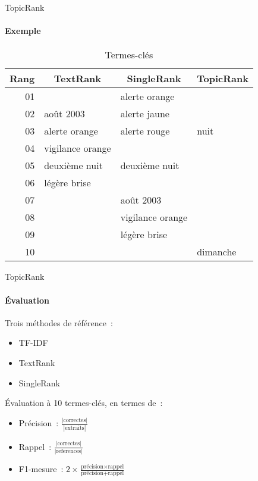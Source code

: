 \begin{frame}{TopicRank}\framesubtitle{Exemple}
  \begin{table}
    \centering
    \begin{tabular}{r|l|l|l}
      \toprule
      \textbf{Rang} & \multicolumn{1}{c|}{\textbf{TextRank}} &
      \multicolumn{1}{c|}{\textbf{SingleRank}} & \multicolumn{1}{c}{\textbf{TopicRank}} \\
      \hline
      01 & \cellcolor{termithorange!30}{août 2012} & alerte orange & \cellcolor{termithorange!30}{Luxembourg}\\
      02 & août 2003 & alerte jaune & \cellcolor{termithorange!30}{alerte} \\
      03 & alerte orange & alerte rouge & nuit \\
      04 & vigilance orange & \cellcolor{termithorange!30}{alerte} & \cellcolor{termithorange!30}{Belgique} \\
      05 & deuxième nuit & deuxième nuit & \cellcolor{termithorange!30}{août 2012}\\
      06 & légère brise & \cellcolor{termithorange!30}{août 2012} & \cellcolor{termithorange!30}{chaleur} \\
      07 & & août 2003 & \cellcolor{termithorange!30}{température} \\
      08 & & vigilance orange & \cellcolor{termithorange!30}{chaude} \\
      09 & & légère brise & \cellcolor{termithorange!30}{canicule} \\
      10 & & \cellcolor{termithorange!30}{Luxembourg} & dimanche \\
      \bottomrule
    \end{tabular}

    \caption{Termes-clés}
  \end{table}
\end{frame}

\begin{frame}{TopicRank}\framesubtitle{Évaluation}
  Trois méthodes de référence~:
  \begin{itemize}
    \item{TF-IDF~\cite{salton1975tfidf}}
    \item{TextRank~\cite{mihalcea2004textrank}}
    \item{SingleRank~\cite{wan2008expandrank}}
  \end{itemize}

  \vspace{1em}

  Évaluation à 10 termes-clés, en termes de~:
  \begin{itemize}
    \item{Précision~: $\frac{|\text{correctes}|}{|\text{extraits}|}$}
    \item{Rappel~: $\frac{|\text{correctes}|}{|\text{references}|}$}
    \item{F1-mesure~: $2 \times \frac{\text{précision} \times \text{rappel}}{\text{précision} + \text{rappel}}$}
  \end{itemize}
\end{frame}

